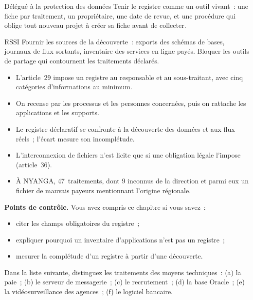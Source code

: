 \begin{boxmetier}{Délégué à la protection des données}
Tenir le registre comme un outil vivant~: une fiche par traitement, un
propriétaire, une date de revue, et une procédure qui oblige tout nouveau
projet à créer sa fiche avant de collecter.
\end{boxmetier}

\begin{boxmetier}{RSSI}
Fournir les sources de la découverte~: exports des schémas de bases,
journaux de flux sortants, inventaire des services en ligne payés. Bloquer
les outils de partage qui contournent les traitements déclarés.
\end{boxmetier}

\begin{boxresume}
\begin{itemize}
    \item L'article~29 impose un registre au responsable et au
          sous-traitant, avec cinq catégories d'informations au minimum.
    \item On recense par les processus et les personnes concernées, puis on
          rattache les applications et les supports.
    \item Le registre déclaratif se confronte à la découverte des données et
          aux flux réels~; l'écart mesure son incomplétude.
    \item L'interconnexion de fichiers n'est licite que si une obligation
          légale l'impose (article~36).
    \item À NYANGA, 47~traitements, dont 9 inconnus de la direction et parmi
          eux un fichier de mauvais payeurs mentionnant l'origine régionale.
\end{itemize}
\end{boxresume}

\begin{boxinfo}
\textbf{Points de contrôle.} Vous avez compris ce chapitre si vous savez~:
\begin{itemize}
    \item citer les champs obligatoires du registre~;
    \item expliquer pourquoi un inventaire d'applications n'est pas un
          registre~;
    \item mesurer la complétude d'un registre à partir d'une découverte.
\end{itemize}
\end{boxinfo}

\begin{boxexo}[title={\ding{45}\quad Exercice~9.1. Traitement ou application \niveaubase}]
Dans la liste suivante, distinguez les traitements des moyens
techniques~: (a) la paie~; (b) le serveur de messagerie~; (c) le
recrutement~; (d) la base Oracle~; (e) la vidéosurveillance des agences~;
(f) le logiciel bancaire.
\end{boxexo}

